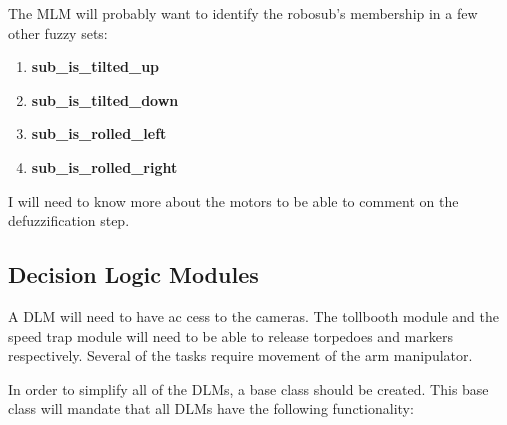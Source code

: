 \documentclass[11pt]{scrartcl}
\begin{document}
    The MLM will probably want to identify the robosub's membership in a few other fuzzy sets:

    \begin{enumerate}
      \item {\bf sub\_is\_tilted\_up}
      \item {\bf sub\_is\_tilted\_down}
      \item {\bf sub\_is\_rolled\_left}
      \item {\bf sub\_is\_rolled\_right}
    \end{enumerate}

    I will need to know more about the motors to be able to comment on the defuzzification step.

  \subsection{Decision Logic Modules}
    A DLM will need to have ac
    cess to the cameras. The tollbooth module and the speed trap module will need to be able to release torpedoes and markers respectively. Several of the tasks require movement of the arm manipulator.

    In order to simplify all of the DLMs, a base class should be created. This base class will mandate that all DLMs have the following functionality:
\end{document}

